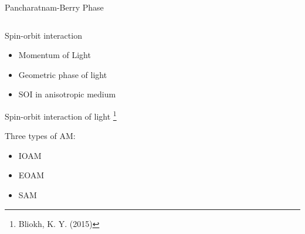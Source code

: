 \documentclass[12pt, dvipsnames]{beamer}
\numberwithin{equation}{section}
\newcommand\blfootnote[1]{%
	\begingroup
	\renewcommand\thefootnote{}\footnote{#1}%
	\addtocounter{footnote}{-1}%
	\endgroup
}
\begin{document}
\begin{frame}[t]{Pancharatnam-Berry Phase}
\begin{columns}
	\end{columns}
\end{frame}

\begin{frame} %
	\centering
	\alert{\huge Spin-orbit interaction}
	\begin{itemize}\Large
		\item<0>Momentum of Light
		\item<0>Geometric phase of light
		\item<1>SOI in anisotropic medium
	\end{itemize}
\end{frame}

\begin{frame}{Spin-orbit interaction of light}\blfootnote{Bliokh, K. Y. (2015)}
	Three types of AM:
	\begin{itemize}
		\item<2->IOAM
		\item<3->EOAM
		\item<4->SAM
	\end{itemize}

\end{frame}
\end{document}
